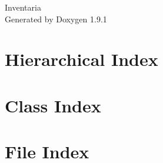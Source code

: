 \let\mypdfximage\pdfximage\def\pdfximage{\immediate\mypdfximage}\documentclass[twoside]{book}
\newcommand{\+}{\discretionary{\mbox{\scriptsize$\hookleftarrow$}}{}{}}
\newcommand{\clearemptydoublepage}{%
  \newpage{\pagestyle{empty}\cleardoublepage}%
}
\begin{document}
\raggedbottom

\hypersetup{pageanchor=false,
             bookmarksnumbered=true,
             pdfencoding=unicode
            }
\begin{titlepage}
\vspace*{7cm}
\begin{center}%
{\Large Inventaria }\\
\vspace*{1cm}
{\large Generated by Doxygen 1.9.1}\\
\end{center}
\end{titlepage}
\clearemptydoublepage
{}
\tableofcontents
\clearemptydoublepage
{}
\hypersetup{pageanchor=true}

\chapter{Hierarchical Index}

\chapter{Class Index}

\chapter{File Index}

\end{document}
